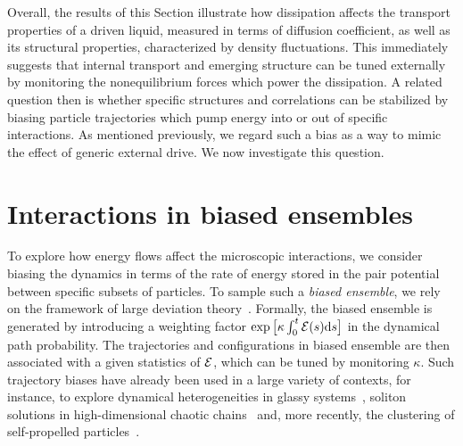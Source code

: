 \documentclass[pre, superscriptaddress, twocolumn,pre]{revtex4-1}
\begin{document}
Overall, the results of this Section illustrate how dissipation affects the transport properties of a driven liquid, measured in terms of diffusion coefficient, as well as its structural properties, characterized by density fluctuations. This immediately suggests that internal transport and emerging structure can be tuned externally by monitoring the nonequilibrium forces which power the dissipation. A related question then is whether specific structures and correlations can be stabilized by biasing particle trajectories which pump energy into or out of specific interactions. As mentioned previously, we regard such a bias as a way to mimic the effect of generic external drive. We now investigate this question. 




\section{Interactions in biased ensembles}\label{sec:bias}

To explore how energy flows affect the microscopic interactions, we consider biasing the dynamics in terms of the rate of energy stored in the pair potential between specific subsets of particles. To sample such a {\it biased ensemble}, we rely on the framework of large deviation theory~\cite{Chetrite2013, Jack2010}. Formally, the biased ensemble is generated by introducing a weighting factor $\exp\big[\kappa\int_0^t{\cal E}(s){\rm d}s\big]$ in the dynamical path probability. The trajectories and configurations in biased ensemble are then associated with a given statistics of $\cal E$, which can be tuned by monitoring $\kappa$. Such trajectory biases have already been used in a large variety of contexts, for instance, to explore dynamical heterogeneities in glassy systems~\cite{garrahan2007, Hedges2009, Pitard2011, Speck2012, Bodineau2012a, Limmer2014, Nemoto2017}, soliton solutions in high-dimensional chaotic chains~\cite{tailleur2007probing, laffargue2013} and, more recently, the clustering of self-propelled particles~\cite{Cagnetta2017, Whitelam2018, nemoto2018optimizing}.
\end{document}
